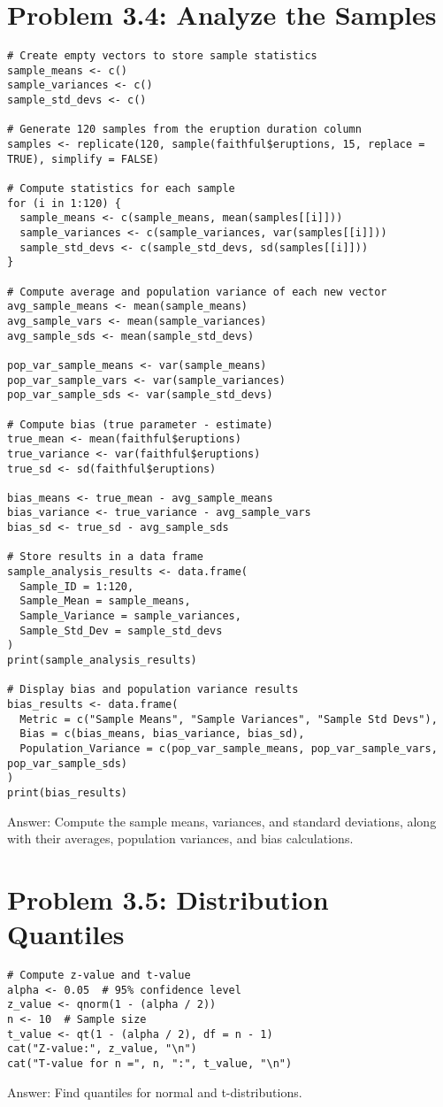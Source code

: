 \documentclass{article}
\begin{document}
\section{Problem 3.4: Analyze the Samples}
\begin{tcolorbox}
\begin{lstlisting}
# Create empty vectors to store sample statistics
sample_means <- c()
sample_variances <- c()
sample_std_devs <- c()

# Generate 120 samples from the eruption duration column
samples <- replicate(120, sample(faithful$eruptions, 15, replace = TRUE), simplify = FALSE)

# Compute statistics for each sample
for (i in 1:120) {
  sample_means <- c(sample_means, mean(samples[[i]]))
  sample_variances <- c(sample_variances, var(samples[[i]]))
  sample_std_devs <- c(sample_std_devs, sd(samples[[i]]))
}

# Compute average and population variance of each new vector
avg_sample_means <- mean(sample_means)
avg_sample_vars <- mean(sample_variances)
avg_sample_sds <- mean(sample_std_devs)

pop_var_sample_means <- var(sample_means)
pop_var_sample_vars <- var(sample_variances)
pop_var_sample_sds <- var(sample_std_devs)

# Compute bias (true parameter - estimate)
true_mean <- mean(faithful$eruptions)
true_variance <- var(faithful$eruptions)
true_sd <- sd(faithful$eruptions)

bias_means <- true_mean - avg_sample_means
bias_variance <- true_variance - avg_sample_vars
bias_sd <- true_sd - avg_sample_sds

# Store results in a data frame
sample_analysis_results <- data.frame(
  Sample_ID = 1:120,
  Sample_Mean = sample_means,
  Sample_Variance = sample_variances,
  Sample_Std_Dev = sample_std_devs
)
print(sample_analysis_results)

# Display bias and population variance results
bias_results <- data.frame(
  Metric = c("Sample Means", "Sample Variances", "Sample Std Devs"),
  Bias = c(bias_means, bias_variance, bias_sd),
  Population_Variance = c(pop_var_sample_means, pop_var_sample_vars, pop_var_sample_sds)
)
print(bias_results)
\end{lstlisting}
\end{tcolorbox}
Answer: Compute the sample means, variances, and standard deviations, along with their averages, population variances, and bias calculations.

\section{Problem 3.5: Distribution Quantiles}
\begin{tcolorbox}
\begin{lstlisting}
# Compute z-value and t-value
alpha <- 0.05  # 95% confidence level
z_value <- qnorm(1 - (alpha / 2))
n <- 10  # Sample size
t_value <- qt(1 - (alpha / 2), df = n - 1)
cat("Z-value:", z_value, "\n")
cat("T-value for n =", n, ":", t_value, "\n")
\end{lstlisting}
\end{tcolorbox}
Answer: Find quantiles for normal and t-distributions.
\end{document}
